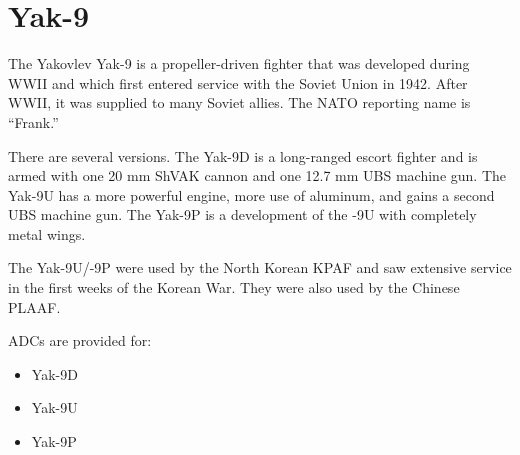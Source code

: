 \section*{Yak-9}

The Yakovlev Yak-9 is a propeller-driven fighter that was developed during WWII and which first entered service with the Soviet Union in 1942. After WWII, it was supplied to many Soviet allies. The NATO reporting name is “Frank.”

There are several versions. The Yak-9D is a long-ranged escort fighter and is armed with one 20 mm ShVAK cannon and one 12.7 mm UBS machine gun. The Yak-9U has a more powerful engine, more use of aluminum, and gains a second UBS machine gun. The Yak-9P is a development of the -9U with completely metal wings.

The Yak-9U/-9P were used by the North Korean KPAF and saw extensive service in the first weeks of the Korean War. They were also used by the Chinese PLAAF.

ADCs are provided for:
\begin{itemize}
\item Yak-9D
\item Yak-9U
\item Yak-9P
\end{itemize}
